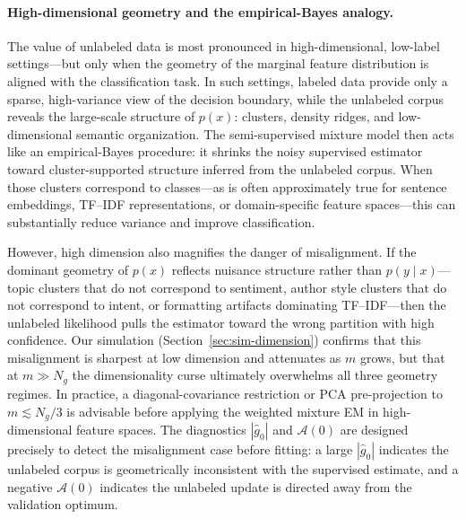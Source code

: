 \documentclass[11pt]{article}
\theoremstyle{definition}
\newcommand{\calA}{\mathcal{A}}
\begin{document}
\paragraph{High-dimensional geometry and the empirical-Bayes analogy.}
The value of unlabeled data is most pronounced in high-dimensional,
low-label settings---but only when the geometry of the marginal feature
distribution is aligned with the classification task.
In such settings, labeled data provide only a sparse, high-variance view
of the decision boundary, while the unlabeled corpus reveals the
large-scale structure of \(p(x)\): clusters, density ridges, and
low-dimensional semantic organization.
The semi-supervised mixture model then acts like an empirical-Bayes
procedure: it shrinks the noisy supervised estimator toward
cluster-supported structure inferred from the unlabeled corpus.
When those clusters correspond to classes---as is often approximately true
for sentence embeddings, TF--IDF representations, or domain-specific feature
spaces---this can substantially reduce variance and improve classification.

However, high dimension also magnifies the danger of misalignment.
If the dominant geometry of \(p(x)\) reflects nuisance structure rather
than \(p(y\mid x)\)---topic clusters that do not correspond to sentiment,
author style clusters that do not correspond to intent, or formatting
artifacts dominating TF--IDF---then the unlabeled likelihood pulls the
estimator toward the wrong partition with high confidence.
Our simulation (Section~\ref{sec:sim-dimension}) confirms that this
misalignment is sharpest at low dimension and attenuates as \(m\) grows,
but that at \(m \gg N_g\) the dimensionality curse ultimately overwhelms
all three geometry regimes.
In practice, a diagonal-covariance restriction or PCA pre-projection to
\(m \lesssim N_g / 3\) is advisable before applying the weighted mixture EM
in high-dimensional feature spaces.
The diagnostics \(|\hat g_0|\) and \(\calA(0)\) are designed precisely
to detect the misalignment case before fitting: a large \(|\hat g_0|\)
indicates the unlabeled corpus is geometrically inconsistent with the
supervised estimate, and a negative \(\calA(0)\) indicates the unlabeled
update is directed away from the validation optimum.
\end{document}
